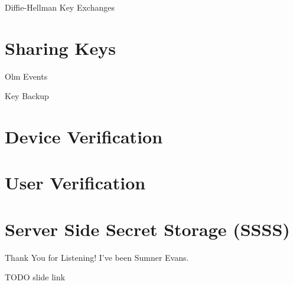 \documentclass{beeper}
\begin{document}
\begin{frame}{Diffie-Hellman Key Exchanges}
\end{frame}

\section{Sharing Keys}

\begin{frame}{Olm Events}
\end{frame}

\begin{frame}{Key Backup}
\end{frame}

\section{Device Verification}

\section{User Verification}

\section{Server Side Secret Storage (SSSS)}

\begin{frame}{Thank You for Listening!}
    I've been Sumner Evans.

    TODO slide link
\end{frame}
\end{document}

